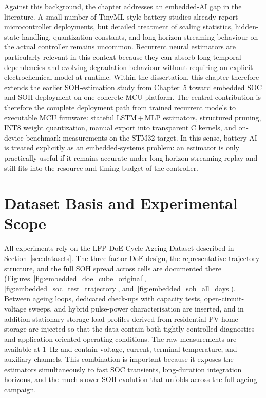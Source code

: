 \documentclass[
    a4paper,
    12pt,
    titlepage,
    bibliography=totoc,
    twoside=on,
    parskip=false,
    numbers=noenddot,
    cleardoublepage=empty,
    DIV=12,
    BCOR=12.0mm,
    headheight=36pt,
    headings=openright
]{scrreprt}
\begin{document}
Against this background, the chapter addresses an embedded-AI gap in the literature. A small number of TinyML-style battery studies already report microcontroller deployments,\autocite{crocioniLiIonBatteriesParameter2020,Embedded_AI_only_SOC_mobile,Embedded_AI_SOH_badData} but detailed treatment of scaling statistics, hidden-state handling, quantization constants, and long-horizon streaming behaviour on the actual controller remains uncommon. Recurrent neural estimators are particularly relevant in this context because they can absorb long temporal dependencies and evolving degradation behaviour without requiring an explicit electrochemical model at runtime.\autocite{liOnlineCapacityEstimation2021,wangFusionEstimationLithiumion2022} Within the dissertation, this chapter therefore extends the earlier SOH-estimation study from Chapter~5 toward embedded SOC and SOH deployment on one concrete MCU platform. The central contribution is therefore the complete deployment path from trained recurrent models to executable MCU firmware: stateful LSTM\,+\,MLP estimators, structured pruning, INT8 weight quantization, manual export into transparent C kernels, and on-device benchmark measurements on the STM32 target. In this sense, battery AI is treated explicitly as an embedded-systems problem: an estimator is only practically useful if it remains accurate under long-horizon streaming replay and still fits into the resource and timing budget of the controller.

\section{Dataset Basis and Experimental Scope}
All experiments rely on the LFP DoE Cycle Ageing Dataset described in Section~\ref{sec:datasets}.\autocite{lfpDoeCycleAgingDataset2025,jgneJGCFR186501800mAh32VProductSpecification} The three-factor DoE design, the representative trajectory structure, and the full SOH spread across cells are documented there (Figures~\ref{fig:embedded_doe_cube_original}, \ref{fig:embedded_soc_test_trajectory}, and~\ref{fig:embedded_soh_all_days}).\autocite{siebertzStatistischeVersuchsplanung2017} Between ageing loops, dedicated check-ups with capacity tests, open-circuit-voltage sweeps, and hybrid pulse-power characterisation are inserted, and in addition stationary-storage load profiles derived from residential PV home storage are injected so that the data contain both tightly controlled diagnostics and application-oriented operating conditions.\autocite{kucevicStandardBatteryEnergy2020a} The raw measurements are available at \SI{1}{\hertz} and contain voltage, current, terminal temperature, and auxiliary channels. This combination is important because it exposes the estimators simultaneously to fast SOC transients, long-duration integration horizons, and the much slower SOH evolution that unfolds across the full ageing campaign.
\end{document}
